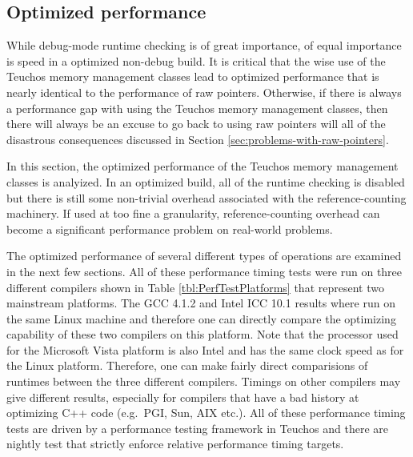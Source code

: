 \documentclass[pdf,ps2pdf,11pt]{SANDreport}
\begin{document}
%
{}\subsection{Optimized performance}
\label{sec:optimized-performance}
%

While debug-mode runtime checking is of great importance, of equal
importance is speed in a optimized non-debug build.  It is critical
that the wise use of the Teuchos memory management classes lead to
optimized performance that is nearly identical to the performance of
raw pointers.  Otherwise, if there is always a performance gap with
using the Teuchos memory management classes, then there will always be
an excuse to go back to using raw pointers will all of the disastrous
consequences discussed in Section
{}\ref{sec:problems-with-raw-pointers}.

In this section, the optimized performance of the Teuchos memory
management classes is analyized.  In an optimized build, all of the
runtime checking is disabled but there is still some non-trivial
overhead associated with the reference-counting machinery.  If used at
too fine a granularity, reference-counting overhead can become a
significant performance problem on real-world problems.

The optimized performance of several different types of operations are
examined in the next few sections.  All of these performance timing
tests were run on three different compilers shown in Table
{}\ref{tbl:PerfTestPlatforms} that represent two mainstream platforms.
The GCC 4.1.2 and Intel ICC 10.1 results where run on the same Linux
machine and therefore one can directly compare the optimizing
capability of these two compilers on this platform.  Note that the
processor used for the Microsoft Vista platform is also Intel and has
the same clock speed as for the Linux platform.  Therefore, one can
make fairly direct comparisions of runtimes between the three
different compilers.  Timings on other compilers may give different
results, especially for compilers that have a bad history at
optimizing C++ code (e.g.\ PGI, Sun, AIX etc.).  All of these
performance timing tests are driven by a performance testing framework
in Teuchos and there are nightly test that strictly enforce relative
performance timing targets.
\end{document}
